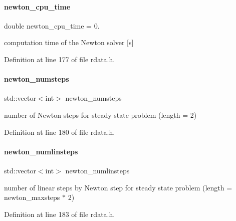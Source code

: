 \paragraph{\texorpdfstring{newton\+\_\+cpu\+\_\+time}{newton\_cpu\_time}}
{\footnotesize\ttfamily double newton\+\_\+cpu\+\_\+time = 0.}

computation time of the Newton solver \mbox{[}s\mbox{]} 

Definition at line 177 of file rdata.\+h.

\mbox{\label{classamici_1_1_return_data_ae8d9136bb7510303556f9935a15b9318}} 
\paragraph{\texorpdfstring{newton\+\_\+numsteps}{newton\_numsteps}}
{\footnotesize\ttfamily std\+::vector$<$int$>$ newton\+\_\+numsteps}

number of Newton steps for steady state problem (length = 2) 

Definition at line 180 of file rdata.\+h.

\mbox{\label{classamici_1_1_return_data_a08ca5d9be9ff8f50955327334e5e87bb}} 
\paragraph{\texorpdfstring{newton\+\_\+numlinsteps}{newton\_numlinsteps}}
{\footnotesize\ttfamily std\+::vector$<$int$>$ newton\+\_\+numlinsteps}

number of linear steps by Newton step for steady state problem (length = newton\+\_\+maxsteps $\ast$ 2) 

Definition at line 183 of file rdata.\+h.

\mbox{\label{classamici_1_1_return_data_ae6c276c43addc2845ce72e7188924cc4}} 
